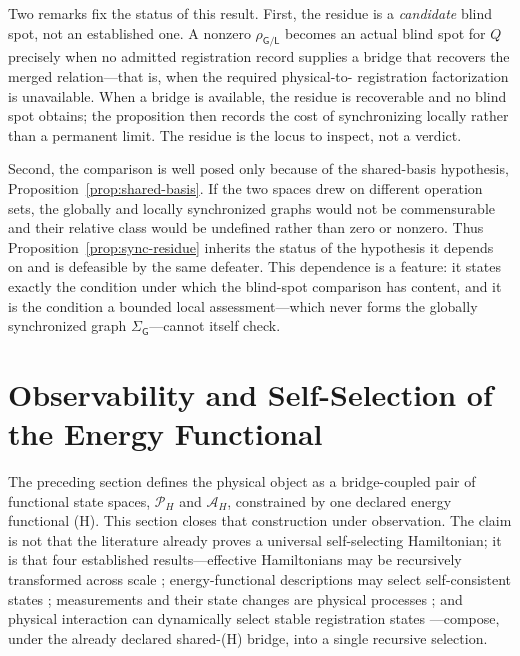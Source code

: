 \documentclass[10pt,twoside,a5paper]{article}
\newcommand{\Pspace}{\ensuremath{\mathcal P_H}}
\newcommand{\ARspace}{\ensuremath{\mathcal A_H}}
\theoremstyle{definition}
\begin{document}
Two remarks fix the status of this result. First, the residue is a \emph{candidate}
blind spot, not an established one. A nonzero $\rho_{\mathsf{G}/\mathsf{L}}$ becomes an
actual blind spot for $Q$ precisely when no admitted registration record supplies a
bridge that recovers the merged relation---that is, when the required physical-to-%
registration factorization is unavailable. When a bridge is available, the residue is
recoverable and no blind spot obtains; the proposition then records the cost of
synchronizing locally rather than a permanent limit. The residue is the locus to
inspect, not a verdict.

Second, the comparison is well posed only because of the shared-basis hypothesis,
Proposition~\ref{prop:shared-basis}. If the two spaces drew on different operation
sets, the globally and locally synchronized graphs would not be commensurable and
their relative class would be undefined rather than zero or nonzero. Thus
Proposition~\ref{prop:sync-residue} inherits the status of the hypothesis it depends
on and is defeasible by the same defeater. This dependence is a feature: it states
exactly the condition under which the blind-spot comparison has content, and it is the
condition a bounded local assessment---which never forms the globally synchronized
graph $\Sigma_{\mathsf{G}}$---cannot itself check.

\section{Observability and Self-Selection of the Energy Functional}
\label{sec:observability-self-selection-energy-functional}

The preceding section defines the physical object as a bridge-coupled pair of
functional state spaces, \Pspace{} and \ARspace{}, constrained by one declared
energy functional (H). This section closes that construction under
observation. The claim is not that the literature already proves a universal
self-selecting Hamiltonian; it is that four established results---effective
Hamiltonians may be recursively transformed across scale
\cite{Kadanoff1966,Wilson1971}; energy-functional descriptions may select
self-consistent states \cite{HohenbergKohn1964,KohnSham1965}; measurements and
their state changes are physical processes \cite{DaviesLewis1970,Ozawa1984};
and physical interaction can dynamically select stable registration states
\cite{Zurek1982}---compose, under the already declared shared-(H) bridge, into
a single recursive selection.
\end{document}
